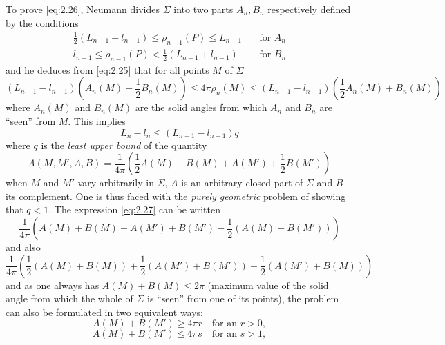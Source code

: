 \documentclass[12pt,a4paper,leqno,twoside]{extbook}
\begin{document}
To prove \eqref{eq:2.26}, Neumann divides \(\Sigma\) into two parts \(A_n, B_n\) respectively defined by the conditions
\[
    \begin{aligned}
        \frac{1}{2} \left( L_{n-1} + l_{n-1} \right) \leq \rho_{n-1}(P) \leq L_{n-1} \quad &\text{for } A_n \\
        l_{n-1} \leq \rho_{n-1}(P) < \frac{1}{2} \left( L_{n-1} + l_{n-1} \right) \quad &\text{for } B_n
    \end{aligned}
\]
and he deduces from \eqref{eq:2.25} that for all points \(M\) of \(\Sigma\)
\[
    \left( L_{n-1} - l_{n-1} \right) \left( A_n(M) + \frac{1}{2} B_n(M) \right) \leq 4\pi \rho_n(M) \leq \left( L_{n-1} - l_{n-1} \right) \left( \frac{1}{2} A_n(M) + B_n(M) \right)
\]
where \(A_n(M)\) and \(B_n(M)\) are the solid angles from which \(A_n\) and \(B_n\) are ``seen'' from \(M\). This implies
\[
    L_n - l_n \leq \left(L_{n-1} - l_{n-1}\right) q
\]
where \(q\) is the \emph{least upper bound} of the quantity
\begin{equation}
    \label{eq:2.27}
    \Lambda(M, M', A, B) = \frac{1}{4\pi} \left( \frac{1}{2} A(M) + B(M) + A(M') + \frac{1}{2} B(M') \right)
\end{equation}
when \(M\) and \(M'\) vary arbitrarily in \(\Sigma\), \(A\) is an arbitrary closed part of \(\Sigma\) and \(B\) its complement. One is thus faced with the \emph{purely geometric} problem of showing that \(q < 1\). The expression \eqref{eq:2.27} can be written
\[
    \frac{1}{4\pi} \left( A(M) + B(M) + A(M') + B(M') - \frac{1}{2} \left( A(M) + B(M') \right) \right)
\]
and also
\[
    \frac{1}{4\pi} \left( \frac{1}{2} \left( A(M) + B(M) \right) + \frac{1}{2} \left( A(M') + B(M') \right) + \frac{1}{2} \left( A(M') + B(M) \right) \right)
\]
and as one always has \(A(M) + B(M) \leq 2\pi\) (maximum value of the solid angle from which the whole of \(\Sigma\) is ``seen'' from one of its points), the problem can also be formulated in two equivalent ways:
\begin{equation}
    \label{eq:2.28}
    A(M) + B(M') \geq 4\pi r \quad \text{for an } r > 0,
\end{equation}
\begin{equation}
    \label{eq:2.29}
    A(M) + B(M') \leq 4\pi s \quad \text{for an } s > 1,
\end{equation}
\end{document}
